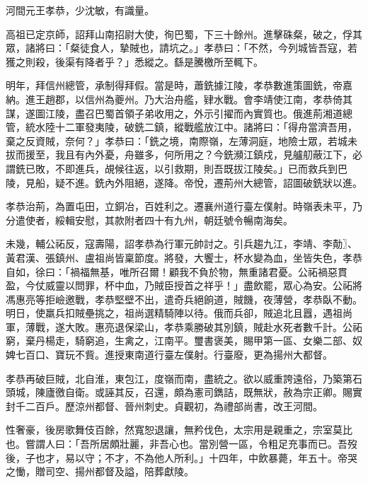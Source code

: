 \begin{pinyinscope}
 河間元王孝恭，少沈敏，有識量。



 高祖已定京師，詔拜山南招尉大使，徇巴蜀，下三十餘州。進擊硃粲，破之，俘其眾，諸將曰：「粲徒食人，摯賊也，請坑之。」孝恭曰：「不然，今列城皆吾寇，若獲之則殺，後渠有降者乎？」悉縱之。繇是騰檄所至輒下。



 明年，拜信州總管，承制得拜假。當是時，蕭銑據江陵，孝恭數進策圖銑，帝嘉納。進王趙郡，以信州為夔州。乃大治舟艦，肄水戰。會李靖使江南，孝恭倚其謀，遂圖江陵，盡召巴蜀首領子弟收用之，外示引擢而內實質也。俄進荊湘道總管，統水陸十二軍發夷陵，破銑二鎮，縱戰艦放江中。諸將曰：「得舟當濟吾用，棄之反資賊，奈何？」孝恭曰：「銑之境，南際嶺，左薄洞庭，地險士眾，若城未拔而援至，我且有內外憂，舟雖多，何所用之？今銑瀕江鎮戍，見艫舠蔽江下，必謂銑已敗，不即進兵，覘候往返，以引救期，則吾既拔江陵矣。」已而救兵到巴陵，見船，疑不進。銑內外阻絕，遂降。帝悅，遷荊州大總管，詔圖破銑狀以進。



 孝恭治荊，為置屯田，立銅冶，百姓利之。遷襄州道行臺左僕射。時嶺表未平，乃分遣使者，綏輯安慰，其款附者四十有九州，朝廷號令暢南海矣。



 未幾，輔公祏反，寇壽陽，詔孝恭為行軍元帥討之。引兵趨九江，李靖、李勣〗、黃君漢、張鎮州、盧祖尚皆稟節度。將發，大饗士，杯水變為血，坐皆失色，孝恭自如，徐曰：「禍福無基，唯所召爾！顧我不負於物，無重諸君憂。公祏禍惡貫盈，今仗威靈以問罪，杯中血，乃賊臣授首之祥乎！」盡飲罷，眾心為安。公祏將馮惠亮等拒嶮邀戰，孝恭堅壁不出，遣奇兵絕餉道，賊饑，夜薄營，孝恭臥不動。明日，使羸兵扣賊壘挑之，祖尚選精騎陣以待。俄而兵卻，賊追北且囂，遇祖尚軍，薄戰，遂大敗。惠亮退保梁山，孝恭乘勝破其別鎮，賊赴水死者數千計。公祏窮，棄丹楊走，騎窮追，生禽之，江南平。璽書褒美，賜甲第一區、女樂二部、奴婢七百口、寶玩不貲。進授東南道行臺左僕射。行臺廢，更為揚州大都督。



 孝恭再破巨賊，北自淮，東包江，度嶺而南，盡統之。欲以威重誇遠俗，乃築第石頭城，陳廬徼自衛。或誣其反，召還，頗為憲司鐫詰，既無狀，赦為宗正卿。賜實封千二百戶。歷涼州都督、晉州刺史。貞觀初，為禮部尚書，改王河間。



 性奢豪，後房歌舞伎百餘，然寬恕退讓，無矜伐色，太宗用是親重之，宗室莫比也。嘗謂人曰：「吾所居頗壯麗，非吾心也。當別營一區，令粗足充事而已。吾歿後，子也才，易以守；不才，不為他人所利。」十四年，中飲暴薨，年五十。帝哭之慟，贈司空、揚州都督及謚，陪葬獻陵。




\end{pinyinscope}

